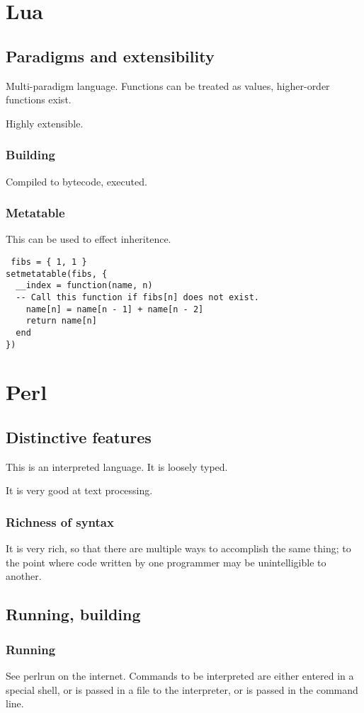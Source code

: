 \chapter{Lua}
\section{Paradigms and extensibility}
Multi-paradigm language. Functions can be treated as values, higher-order functions exist.

Highly extensible.

\subsection{Building}
Compiled to bytecode, executed.

\subsection{Metatable}
This can be used to effect inheritence.
\begin{verbatim}
 fibs = { 1, 1 }
setmetatable(fibs, {
  __index = function(name, n)
  -- Call this function if fibs[n] does not exist.
    name[n] = name[n - 1] + name[n - 2]
    return name[n]
  end
})
\end{verbatim}


\chapter{Perl}
\section{Distinctive features}
This is an interpreted language. It is loosely typed.

It is very good at text processing.

\subsection{Richness of syntax}
It is very rich, so that there are multiple ways to accomplish the same thing; to the point where code written by one programmer may be unintelligible to another.

\section{Running, building}
\subsection{Running}
See perlrun on the internet. Commands to be interpreted are either entered in a special shell, or is passed in a file to the interpreter, or is passed in the command line.


